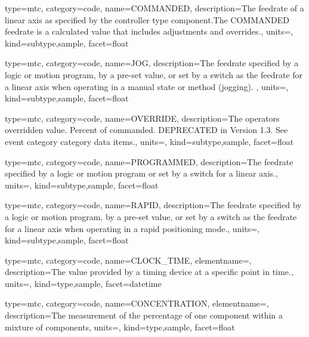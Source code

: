 {
  type=mtc,
  category=code,
  name={COMMANDED},
  description={The feedrate of a linear axis as specified by the \gls{controller} type component.The COMMANDED feedrate is a calculated value that includes adjustments and overrides.},
  units=,
  kind={subtype,sample},
  facet={\gls{float}}
}


{
  type=mtc,
  category=code,
  name={JOG},
  description={The feedrate specified by a logic or motion program, by a pre-set value, or set by a switch as the feedrate for a linear axis when operating in a manual state or method (jogging).  },
  units=,
  kind={subtype,sample},
  facet={\gls{float}}
}


{
  type=mtc,
  category=code,
  name={OVERRIDE},
  description={The operators overridden value. Percent of commanded.  DEPRECATED in Version 1.3.   See \gls{event category} category data items.},
  units=,
  kind={subtype,sample},
  facet={\gls{float}}
}


{
  type=mtc,
  category=code,
  name={PROGRAMMED},
  description={The feedrate specified by a logic or motion program or set by a switch for a linear axis.},
  units=,
  kind={subtype,sample},
  facet={\gls{float}}
}


{
  type=mtc,
  category=code,
  name={RAPID},
  description={The feedrate specified by a logic or motion program, by a pre-set value, or set by a switch as the feedrate for a linear axis when operating in a rapid positioning mode.},
  units=,
  kind={subtype,sample},
  facet={\gls{float}}
}


{
  type=mtc,
  category=code,
  name={CLOCK\_TIME},
  elementname=,
  description={The value provided by a timing device at a specific point in time.},
  units=,
  kind={type,sample},
  facet={\gls{datetime}}
}


{
  type=mtc,
  category=code,
  name={CONCENTRATION},
  elementname=,
  description={The measurement of the percentage of one component within a mixture of components},
  units=,
  kind={type,sample},
  facet={\gls{float}}
}


